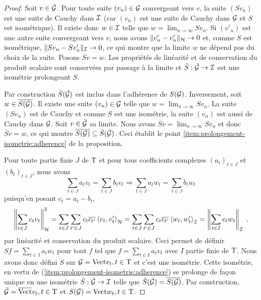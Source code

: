 \begin{proof}\smartqed
  Soit $v \in \bar{\mathcal{G}}$. Pour toute suite $(v_n) \in \mathcal{G}$ convergeant vers
  $v$, la suite $(Sv_n)$ est une suite de Cauchy dans $\mathcal{I}$ (car $(v_n)$ est
  une suite de Cauchy dans $\mathcal{G}$ et $S$ est isom\'{e}trique). Il existe donc $w
  \in \mathcal{I}$ telle que $w = \lim_{n \to \infty} Sv_n$. Si $(v'_n)$ est une
  autre suite convergeant vers $v$, nous avons $\|v'_n - v'_n\|_{\mathcal{H}} \to 0$
  et, comme $S$ est isom\'{e}trique, $\|Sv_n - Sv'_n\|_{\mathcal{I}} \to 0$, ce qui montre
  que la limite $w$ ne d\'{e}pend pas du choix de la suite. Posons $\bar{S}v=
  w$. Les propri\'{e}t\'{e}s de lin\'{e}arit\'{e} et de conservation du produit scalaire sont
  conserv\'{e}es par passage \`{a} la limite et $\bar{S}: \bar{\mathcal{G}} \to \mathcal{I}$ est
  une isom\'{e}trie prolongeant $S$.

Par construction $\bar{S}(\bar{\mathcal{G}})$ est inclus dans l'adh\'{e}rence de $S(\mathcal{G})$. Inversement, soit $w \in \overline{S(\mathcal{G})}$.
Il existe une suite $(v_n) \in \mathcal{G}$ telle que $w= \lim_{n \to \infty} Sv_n$. La suite $(Sv_n)$ est de Cauchy et comme $S$ est une isom\'{e}trie, la suite $(v_n)$ est aussi de Cauchy dans $\mathcal{G}$. Soit $v \in \bar{\mathcal{G}}$ sa limite. Nous avons $\bar{S}v= \lim_{n \to \infty} S v_n$ et donc $\bar{S}v= w$, ce qui montre $\overline{S(\mathcal{G})} \subseteq \bar{S}(\bar{\mathcal{G}})$. Ceci \'{e}tablit le point \eqref{item:prolongement-isometrie:adherence} de la proposition.

Pour toute partie finie $J$ de
$\mathrm{T}$ et pour tous coefficients complexes $(a_t)_{t \in J}$ et $(b_t)_{t \in
  J}$, nous avons
$$
\sum_{t \in J} a_t v_t=\sum_{t \in J} b_t v_t \Rightarrow
\sum_{t \in J} a_t w_t=\sum_{t \in J} b_t w_t
$$
puisqu'en posant $c_t=a_t-b_t$,
\begin{equation*}
\left\| \sum_{t \in J} c_t v_t \right\|_{\mathcal{H}}^2 =
\sum_{t \in J} \sum_{t' \in J} c_{t} \overline{c_{t'}}
\left\langle v_t, v_t' \right\rangle_{\mathcal{H}}=
 \sum_{t \in J} \sum_{t' \in J} c_{t} \overline{c_{t'}}
 \left\langle w_t, w_t' \right\rangle_{\mathcal{I}}
=\left\| \sum_{t \in I} c_t w_t \right\|_{\mathcal{I}} \;,
\end{equation*}
par lin\'{e}arit\'{e} et conservation du produit scalaire.  Ceci permet de d\'{e}finir $Sf=
\sum_{t \in I} a_t w_t$ pour tout $f$ tel que $f = \sum_{t \in I} a_t
v_t$ avec $I$ partie finie de $\mathrm{T}$. Nous avons donc d\'{e}fini $S$ sur
$\mathcal{G}=\mathrm{Vect}{v_t, t \in \mathrm{T}}$ et c'est une isom\'{e}trie. Cette isom\'{e}trie, en
vertu de (\ref{item:prolongement-isometrie:adherence}) se prolonge de fa\c{c}on
unique en une isom\'{e}trie $\bar{S}: \bar{\mathcal{G}} \to \mathcal{I}$ telle que
$\bar{S}(\bar{\mathcal{G}})= \overline{S(\mathcal{G})}$.  Par construction, $\bar{\mathcal{G}}=
\overline{\mathrm{Vect}}{v_t, t \in \mathrm{T}}$ et $S(\mathcal{G}) = \mathrm{Vect}{w_t, t \in \mathrm{T}}$.

\end{proof}





